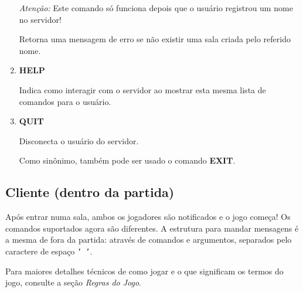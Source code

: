 \documentclass{article}
\begin{document}
\begin{enumerate}
            \emph{Atenção:} Este comando só funciona depois que o usuário registrou um nome no servidor! \par
            Retorna uma mensagem de erro se não existir uma sala criada pelo referido nome.
        \item \textbf{HELP} \par
            Indica como interagir com o servidor ao mostrar esta mesma lista de comandos para o usuário.
        \item \textbf{QUIT} \par
            Disconecta o usuário do servidor. \par
            Como sinônimo, também pode ser usado o comando \textbf{EXIT}.
        \end{enumerate}
     \subsection{Cliente (dentro da partida)}
        Após entrar numa sala, ambos os jogadores são notificados e o jogo começa! Os comandos suportados agora são diferentes. A estrutura para mandar mensagens é a mesma de fora da partida: através de comandos e argumentos, separados pelo caractere de espaço \texttt{' '}. \par

        Para maiores detalhes técnicos de como jogar e o que significam os termos do jogo, consulte a seção \emph{Regras do Jogo}. \par
\end{document}
